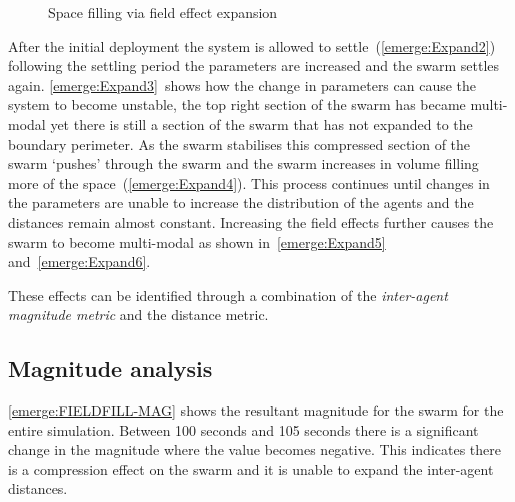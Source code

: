 \begin{figure}[H]
{	 \label{emerge:Expand5}
}
\caption{Space filling via field effect expansion}
\label{methods:ExpansionFill}
\end{figure}

After the initial deployment the system is allowed to settle~(\autoref{emerge:Expand2}) following the settling period the parameters are increased and the swarm settles again. \autoref{emerge:Expand3}~shows how the change in parameters can cause the system to become unstable, the top right section of the swarm has became multi-modal yet there is still a section of the swarm that has not expanded to the boundary perimeter. As the swarm stabilises this compressed section of the swarm `pushes' through the swarm and the swarm increases in volume filling more of the space~(\autoref{emerge:Expand4}). This process continues until changes in the parameters are unable to increase the distribution of the agents and the distances remain almost constant. Increasing the field effects further causes the swarm to become multi-modal as shown in~\ref{emerge:Expand5} and~\ref{emerge:Expand6}.

These effects can be identified through a combination of the \textit{inter-agent magnitude metric} and the distance metric.

\subsection{Magnitude analysis}
\autoref{emerge:FIELDFILL-MAG} shows the resultant magnitude for the swarm for the entire simulation. Between 100 seconds and 105 seconds there is a significant change in the magnitude where the value becomes negative. This indicates there is a compression effect on the swarm and it is unable to expand the inter-agent distances.

